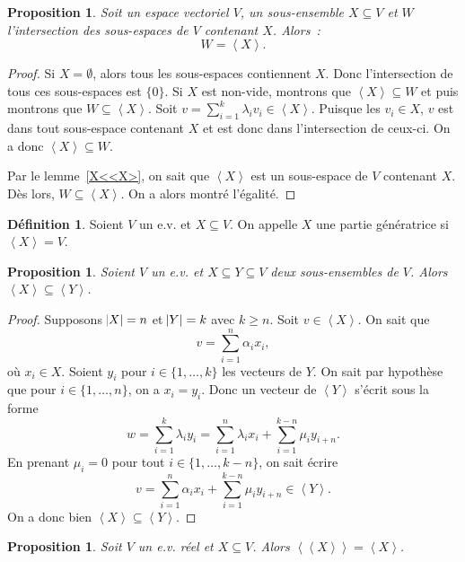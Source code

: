 \documentclass{article}
\newcommand{\eng}[1]{\left\langle#1\right\rangle}
\newtheorem{prp}[thm]{Proposition}
\theoremstyle{definition}
\newtheorem{déf}[thm]{Définition}
\theoremstyle{remark}
\begin{document}
		\begin{prp} Soit un espace vectoriel $V$, un sous-ensemble $X \subseteq V$ et $W$ l'intersection des sous-espaces de $V$ contenant $X$. Alors~: \[W = \eng X.\]
		\end{prp}

		\begin{proof} Si $X = \emptyset$, alors tous les sous-espaces contiennent $X$. Donc l'intersection de tous ces sous-espaces est $\{0\}$. Si $X$ est non-vide,
		montrons que $\eng X \subseteq W$ et puis montrons que $W \subseteq \eng X$. Soit $v = \sum_{i=1}^k\lambda_iv_i \in \eng X$. Puisque les $v_i \in X$, $v$ est
		dans tout sous-espace contenant $X$ et est donc dans l'intersection de ceux-ci. On a donc $\eng X \subseteq W$.

		Par le lemme~\ref{X<<X>}, on sait que $\eng X$ est un sous-espace de $V$ contenant $X$. Dès lors, $W \subseteq \eng X$. On a alors montré l'égalité. \end{proof}

		\begin{déf} Soient $V$ un e.v. et $X \subseteq V$. On appelle $X$ une partie génératrice si $\eng X = V$. \end{déf}

		\begin{prp}\label{engXDansEngY} Soient $V$ un e.v. et $X \subseteq Y \subseteq V$ deux sous-ensembles de $V$. Alors $\eng X \subseteq \eng Y$. \end{prp}

		\begin{proof} Supposons $\abs X = n$ et $\abs Y = k$ avec $k \geq n$. Soit $v \in \eng X$. On sait que \[v = \sum_{i=1}^n\alpha_ix_i,\] où $x_i \in X$.
		Soient $y_i$ pour $i \in \{1, \dotsc, k\}$ les vecteurs de $Y$. On sait par hypothèse que pour $i \in \{1, \dotsc, n\}$, on a $x_i = y_i$. Donc un vecteur de
		$\eng Y$ s'écrit sous la forme \[w = \sum_{i=1}^k\lambda_iy_i = \sum_{i=1}^n\lambda_ix_i + \sum_{i=1}^{k-n}\mu_iy_{i+n}.\] En prenant $\mu_i = 0$ pour tout
		$i \in \{1, \dotsc, k-n\}$, on sait écrire \[v = \sum_{i=1}^n\alpha_ix_i + \sum_{i=1}^{k-n}\mu_iy_{i+n} \in \eng Y.\] On a donc bien $\eng X \subseteq \eng Y$.
		\end{proof}

		\begin{prp} Soit $V$ un e.v. réel et $X \subseteq V$. Alors $\eng {\eng X} = \eng X$. \end{prp}
\end{document}
